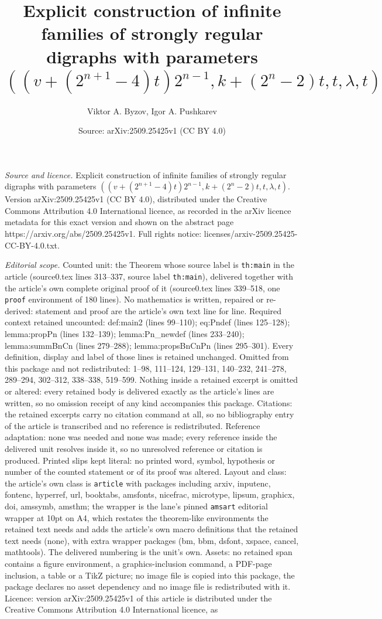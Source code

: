 \documentclass[10pt,a4paper]{amsart}
\title[Explicit construction of infinite families of strongly regul]{Explicit construction of infinite families of strongly regular digraphs with parameters $((v+(2^{n+1}-4)t)2^{n-1}, k+(2^n-2)t, t, \lambda, t)$}
\author{Viktor A. Byzov, Igor A. Pushkarev}
\date{Source: arXiv:2509.25425v1 (CC BY 4.0)}
\begin{document}
\maketitle

\noindent\emph{Source and licence.} Explicit construction of infinite families of strongly regular digraphs with parameters $((v+(2^{n+1}-4)t)2^{n-1}, k+(2^n-2)t, t, \lambda, t)$. Version arXiv:2509.25425v1 (CC BY 4.0), distributed under the Creative Commons Attribution 4.0 International licence, as recorded in the arXiv licence metadata for this exact version and shown on the abstract page https://arxiv.org/abs/2509.25425v1. Full rights notice: licenses/arxiv-2509.25425-CC-BY-4.0.txt.\par\smallskip

\noindent\textit{Editorial scope.} Counted unit: the Theorem whose source label is \texttt{th:main} in the article (source0.tex lines 313--337, source label \texttt{th:main}), delivered together with the article's own complete original proof of it (source0.tex lines 339--518, one \texttt{proof} environment of 180 lines). No mathematics is written, repaired or re-derived: statement and proof are the article's own text line for line. Required context retained uncounted: def:main2 (lines 99--110); eq:Pndef (lines 125--128); lemma:propPn (lines 132--139); lemma:Pn\_newdef (lines 233--240); lemma:summBnCn (lines 279--288); lemma:propsBnCnPn (lines 295--301). Every definition, display and label of those lines is retained unchanged. Omitted from this package and not redistributed: 1--98, 111--124, 129--131, 140--232, 241--278, 289--294, 302--312, 338--338, 519--599. Nothing inside a retained excerpt is omitted or altered: every retained body is delivered exactly as the article's lines are written, so no omission receipt of any kind accompanies this package. Citations: the retained excerpts carry no citation command at all, so no bibliography entry of the article is transcribed and no reference is redistributed. Reference adaptation: none was needed and none was made; every reference inside the delivered unit resolves inside it, so no unresolved reference or citation is produced. Printed slips kept literal: no printed word, symbol, hypothesis or number of the counted statement or of its proof was altered. Layout and class: the article's own class is \texttt{article} with packages including arxiv, inputenc, fontenc, hyperref, url, booktabs, amsfonts, nicefrac, microtype, lipsum, graphicx, doi, amssymb, amsthm; the wrapper is the lane's pinned \texttt{amsart} editorial wrapper at 10pt on A4, which restates the theorem-like environments the retained text needs and adds the article's own macro definitions that the retained text needs (none), with extra wrapper packages (bm, bbm, dsfont, xspace, cancel, mathtools). The delivered numbering is the unit's own. Assets: no retained span contains a figure environment, a graphics-inclusion command, a PDF-page inclusion, a table or a TikZ picture; no image file is copied into this package, the package declares no asset dependency and no image file is redistributed with it. Licence: version arXiv:2509.25425v1 of this article is distributed under the Creative Commons Attribution 4.0 International licence, as 
\end{document}
